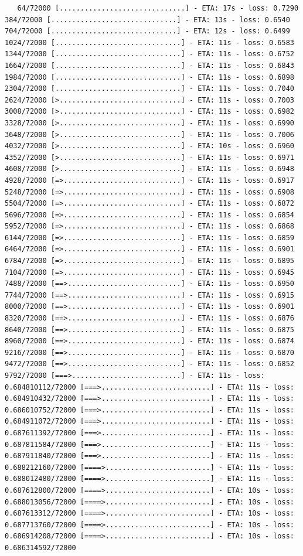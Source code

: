 \documentclass[12pt,fleqn]{article}\usepackage{../../common}
\begin{document}
\begin{verbatim}
   64/72000 [..............................] - ETA: 17s - loss: 0.7290  384/72000 [..............................] - ETA: 13s - loss: 0.6540  704/72000 [..............................] - ETA: 12s - loss: 0.6499 1024/72000 [..............................] - ETA: 11s - loss: 0.6583 1344/72000 [..............................] - ETA: 11s - loss: 0.6752 1664/72000 [..............................] - ETA: 11s - loss: 0.6843 1984/72000 [..............................] - ETA: 11s - loss: 0.6898 2304/72000 [..............................] - ETA: 11s - loss: 0.7040 2624/72000 [>.............................] - ETA: 11s - loss: 0.7003 3008/72000 [>.............................] - ETA: 11s - loss: 0.6982 3328/72000 [>.............................] - ETA: 11s - loss: 0.6990 3648/72000 [>.............................] - ETA: 11s - loss: 0.7006 4032/72000 [>.............................] - ETA: 10s - loss: 0.6960 4352/72000 [>.............................] - ETA: 11s - loss: 0.6971 4608/72000 [>.............................] - ETA: 11s - loss: 0.6948 4928/72000 [=>............................] - ETA: 11s - loss: 0.6917 5248/72000 [=>............................] - ETA: 11s - loss: 0.6908 5504/72000 [=>............................] - ETA: 11s - loss: 0.6872 5696/72000 [=>............................] - ETA: 11s - loss: 0.6854 5952/72000 [=>............................] - ETA: 11s - loss: 0.6868 6144/72000 [=>............................] - ETA: 11s - loss: 0.6859 6464/72000 [=>............................] - ETA: 11s - loss: 0.6901 6784/72000 [=>............................] - ETA: 11s - loss: 0.6895 7104/72000 [=>............................] - ETA: 11s - loss: 0.6945 7488/72000 [==>...........................] - ETA: 11s - loss: 0.6950 7744/72000 [==>...........................] - ETA: 11s - loss: 0.6915 8000/72000 [==>...........................] - ETA: 11s - loss: 0.6901 8320/72000 [==>...........................] - ETA: 11s - loss: 0.6876 8640/72000 [==>...........................] - ETA: 11s - loss: 0.6875 8960/72000 [==>...........................] - ETA: 11s - loss: 0.6874 9216/72000 [==>...........................] - ETA: 11s - loss: 0.6870 9472/72000 [==>...........................] - ETA: 11s - loss: 0.6852 9792/72000 [===>..........................] - ETA: 11s - loss: 0.684810112/72000 [===>..........................] - ETA: 11s - loss: 0.684910432/72000 [===>..........................] - ETA: 11s - loss: 0.686010752/72000 [===>..........................] - ETA: 11s - loss: 0.684911072/72000 [===>..........................] - ETA: 11s - loss: 0.687611392/72000 [===>..........................] - ETA: 11s - loss: 0.687811584/72000 [===>..........................] - ETA: 11s - loss: 0.687911840/72000 [===>..........................] - ETA: 11s - loss: 0.688212160/72000 [====>.........................] - ETA: 11s - loss: 0.688012480/72000 [====>.........................] - ETA: 11s - loss: 0.687612800/72000 [====>.........................] - ETA: 10s - loss: 0.688013056/72000 [====>.........................] - ETA: 10s - loss: 0.687613312/72000 [====>.........................] - ETA: 10s - loss: 0.687713760/72000 [====>.........................] - ETA: 10s - loss: 0.686914208/72000 [====>.........................] - ETA: 10s - loss: 0.686314592/72000 
\end{verbatim}
\end{document}
